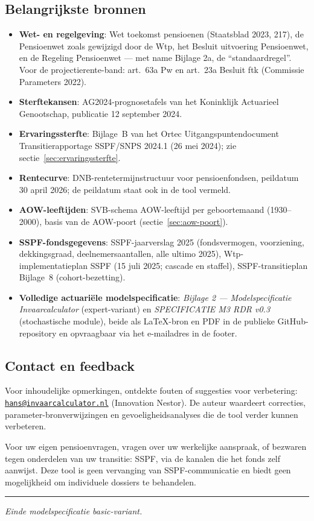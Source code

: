 \documentclass[11pt,a4paper]{article}
\begin{document}
\subsection{Belangrijkste bronnen}
\label{sec:bronnen}

\begin{itemize}
\item \textbf{Wet- en regelgeving}: Wet toekomst pensioenen (Staatsblad 2023, 217), de Pensioenwet zoals gewijzigd door de Wtp, het Besluit uitvoering Pensioenwet, en de Regeling Pensioenwet --- met name Bijlage 2a, de ``standaardregel''. Voor de projectierente-band: art.\ 63a Pw en art.\ 23a Besluit ftk (Commissie Parameters 2022).
\item \textbf{Sterftekansen}: AG2024-prognosetafels van het Koninklijk Actuarieel Genootschap, publicatie 12 september 2024.
\item \textbf{Ervaringssterfte}: Bijlage~B van het Ortec Uitgangspuntendocument Transitierapportage SSPF/SNPS 2024.1 (26 mei 2024); zie sectie~\ref{sec:ervaringssterfte}.
\item \textbf{Rentecurve}: DNB-rentetermijnstructuur voor pensioenfondsen, peildatum 30 april 2026; de peildatum staat ook in de tool vermeld.
\item \textbf{AOW-leeftijden}: SVB-schema AOW-leeftijd per geboortemaand (1930--2000), basis van de AOW-poort (sectie~\ref{sec:aow-poort}).
\item \textbf{SSPF-fondsgegevens}: SSPF-jaarverslag 2025 (fondsvermogen, voorziening, dekkingsgraad, deelnemersaantallen, alle ultimo 2025), Wtp-implementatieplan SSPF (15 juli 2025; cascade en staffel), SSPF-transitieplan Bijlage~8 (cohort-bezetting).
\item \textbf{Volledige actuariële modelspecificatie}: \emph{Bijlage 2 --- Modelspecificatie Invaarcalculator} (expert-variant) en \emph{SPECIFICATIE M3 RDR v0.3} (stochastische module), beide als LaTeX-bron en PDF in de publieke GitHub-repository en opvraagbaar via het e-mailadres in de footer.
\end{itemize}

\subsection{Contact en feedback}

Voor inhoudelijke opmerkingen, ontdekte fouten of suggesties voor verbetering: \href{mailto:hans@invaarcalculator.nl}{\nolinkurl{hans@invaarcalculator.nl}} (Innovation Nestor). De auteur waardeert correcties, parameter-bronverwijzingen en gevoeligheidsanalyses die de tool verder kunnen verbeteren.

Voor uw eigen pensioenvragen, vragen over uw werkelijke aanspraak, of bezwaren tegen onderdelen van uw transitie: SSPF, via de kanalen die het fonds zelf aanwijst. Deze tool is geen vervanging van SSPF-communicatie en biedt geen mogelijkheid om individuele dossiers te behandelen.

\vspace{2em}
\hrule
\vspace{0.5em}
\emph{Einde modelspecificatie basic-variant.}
\end{document}
